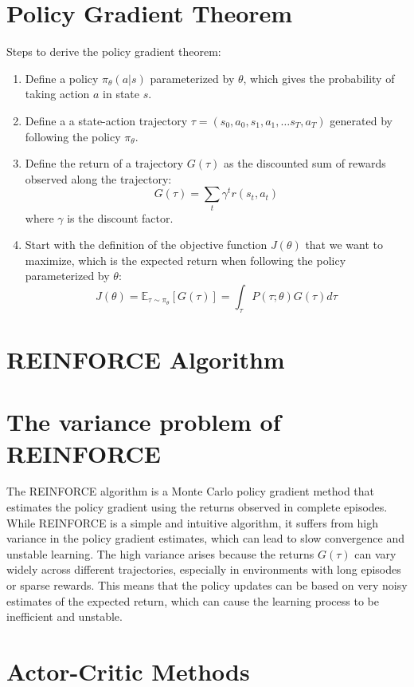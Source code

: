 \documentclass{article}
\begin{document}
\section{Policy Gradient Theorem}

Steps to derive the policy gradient theorem:

\begin{enumerate}
    \item Define a policy \( \pi_\theta(a|s) \) parameterized by \( \theta \), which gives the probability of taking action \( a \) in state \( s \).
    \item Define a a state-action trajectory \( \tau = (s_0, a_0, s_1, a_1, \ldots s_T, a_T) \) generated by following the policy \( \pi_\theta \).
    \item Define the return of a trajectory \( G (\tau) \) as the discounted sum of rewards observed along the trajectory:
    \begin{equation}
    G(\tau) = \sum_{t} \gamma^t r (s_t, a_t)
    \end{equation}
    where \( \gamma \) is the discount factor.
    \item Start with the definition of the objective function \( J(\theta) \) that we want to maximize, which is the expected return when following the policy parameterized by \( \theta \):
    \begin{equation}
    J(\theta) = \mathbb{E}_{\tau \sim \pi_\theta} [G (\tau)] = \int_{\tau} P(\tau ; \theta) G(\tau) d\tau
    \end{equation}
\end{enumerate}

\section{REINFORCE Algorithm}


\section{The variance problem of REINFORCE}
\quad The REINFORCE algorithm is a Monte Carlo policy gradient method that estimates the policy gradient using the returns observed in complete episodes.
While REINFORCE is a simple and intuitive algorithm, it suffers from high variance in the policy gradient estimates, which can lead to slow convergence and unstable learning.
The high variance arises because the returns \( G(\tau) \) can vary widely across different trajectories, especially in environments with long episodes or sparse rewards. 
This means that the policy updates can be based on very noisy estimates of the expected return, which can cause the learning process to be inefficient and unstable.


\section{Actor-Critic Methods}
\end{document}
